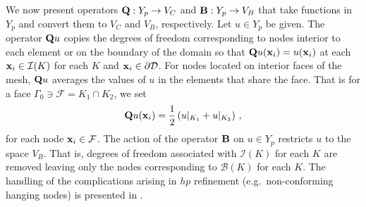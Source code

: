 \documentclass[../doc.tex]{subfiles}
\begin{document}
We now present operators $\boldsymbol{\mathrm{Q}} : Y_p \rightarrow V_C$ and $\boldsymbol{\mathrm{B}} : Y_p \rightarrow V_B$ that take functions in $Y_p$ and convert them to $V_C$ and $V_B$, respectively. Let $u \in Y_p$ be given. The operator $\boldsymbol{\mathrm{Q}}u$ copies the degrees of freedom corresponding to nodes interior to each element or on the boundary of the domain so that $\boldsymbol{\mathrm{Q}}u(\boldsymbol{\mathrm{x}}_i) = u(\boldsymbol{\mathrm{x}}_i)$ at each $\boldsymbol{\mathrm{x}}_i \in \mathcal{I}(K)$ for each $K$ and $\boldsymbol{\mathrm{x}}_i \in \partial\mathcal{D}$. For nodes located on interior faces of the mesh, $\boldsymbol{\mathrm{Q}}u$ averages the values of $u$ in the elements that share the face. That is for a face $\Gamma_0 \ni \mathcal{F} = K_1 \cap K_2$, we set 
	\begin{equation}
		\boldsymbol{\mathrm{Q}}u(\boldsymbol{\mathrm{x}}_i) = \frac{1}{2}\left( u|_{K_1} + u|_{K_2} \right) \,,
	\end{equation}
for each node $\boldsymbol{\mathrm{x}}_i \in \mathcal{F}$. 
The action of the operator $\boldsymbol{\mathrm{B}}$ on $u\in Y_p$ restricts $u$ to the space $V_B$. That is, degrees of freedom associated with $\mathcal{I}(K)$ for each $K$ are removed leaving only the nodes corresponding to $\mathcal{B}(K)$ for each $K$. The handling of the complications arising in $hp$ refinement (e.g.~non-conforming hanging nodes) is presented in \cite{Pazner2021}. 
\end{document}
